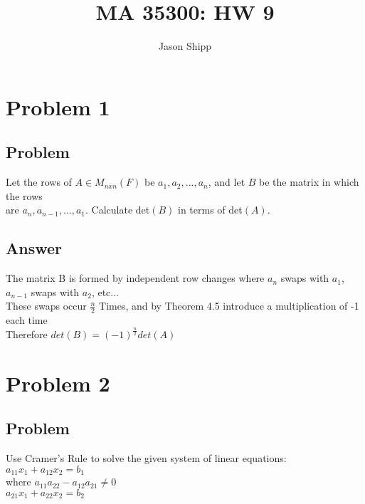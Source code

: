 \documentclass{article}
\newcommand\tab[1][1cm]{\hspace*{#1}}
\begin{document}
\title{MA 35300: HW 9}
\author{Jason Shipp}
\maketitle
\section*{Problem 1}
\subsection*{Problem}
Let the rows of \(A \in M_{n x n}(F)\) be \(a_{1},a_{2},...,a_{n}\), and let \(B\) be the matrix in which the rows 
\\ are \(a_{n},a_{n-1},...,a_{1}\). Calculate det\((B)\) in terms of det\((A)\).
\subsection*{Answer}
The matrix B is formed by independent row changes where \(a_{n}\) swaps with \(a_{1}\), \(a_{n-1}\) swaps with \(a_{2}\), etc...
\\ These swaps occur \(\frac{n}{2}\) Times, and by Theorem 4.5 introduce a multiplication of -1 each time
\\ Therefore \(det(B) = (-1)^{\frac{n}{2}} det(A)\)
\section*{Problem 2}
\subsection*{Problem}
Use Cramer's Rule to solve the given system of linear equations:
\\ \tab[2cm] \(a_{11}x_{1} + a_{12}x_{2} = b_{1}\)
\\ \tab[2cm] \tab[2cm] \tab[2cm] where \(a_{11}a_{22} - a_{12}a_{21} \ne 0\)
\\ \tab[2cm] \(a_{21}x_{1} + a_{22}x_{2} = b_{2}\)
\end{document}
